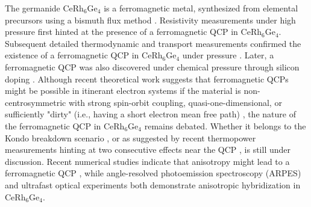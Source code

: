 \documentclass[preprint,12pt]{elsarticle}
\begin{document}

The germanide CeRh$_6$Ge$_4$ is a ferromagnetic metal, synthesized from elemental precursors using a bismuth flux method \cite{Vosswinkel2012_ZfNatB67-1241}.%
Resistivity measurements under high pressure \cite{Kotegawa2019_JPSJ88-093702} %
first hinted at the presence of a ferromagnetic QCP in CeRh$_6$Ge$_4$. Subsequent detailed thermodynamic and transport measurements confirmed the existence of a ferromagnetic QCP in CeRh$_6$Ge$_4$ under pressure \cite{Shen_2020}. %
Later, a ferromagnetic QCP was also discovered under chemical pressure through silicon doping \cite{Zhang2022_PRB106-054409}.%
Although recent theoretical work suggests that ferromagnetic QCPs might be possible in itinerant electron systems if the material is non-centrosymmetric with strong spin-orbit coupling, quasi-one-dimensional, or sufficiently "dirty" (i.e., having a short electron mean free path) \cite{Kirkpatrick2020_PRL124-147201}, %
the nature of the ferromagnetic QCP in CeRh$_6$Ge$_4$ remains debated. Whether it belongs to the Kondo breakdown scenario \cite{Komijani2018_PRL120-157206,Shen_2020} ,%
or as suggested by recent thermopower measurements hinting at two consecutive effects near the QCP \cite{Thomas2024_PRB109-L121105},%
is still under discussion. Recent numerical studies indicate that anisotropy might lead to a ferromagnetic QCP \cite{Chen2022_PRB106-075114,Wang2022_SCPMA65-257211},%
while angle-resolved photoemission spectroscopy (ARPES) \cite{Wu_2021} %
and ultrafast optical experiments \cite{Pei2021_PRB103-L180409} %
both demonstrate anisotropic hybridization in CeRh$_6$Ge$_4$.
\end{document}
